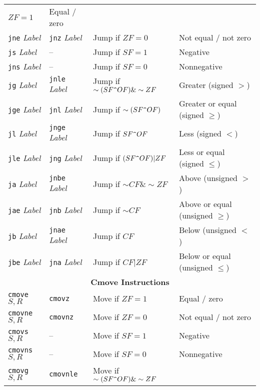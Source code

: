 \begin{table}[h]
\begin{tabular}{l l l l}
        $ZF = 1$ & Equal / zero \\
        \texttt{jne} \textit{Label}  & \texttt{jnz} \textit{Label} & Jump if 
        $ZF = 0$ & Not equal / not zero \\
        \texttt{js} \textit{Label}  & – & Jump if 
        $SF = 1$ & Negative \\
        \texttt{jns} \textit{Label}  & – & Jump if 
        $SF = 0$ & Nonnegative \\
        \texttt{jg} \textit{Label}  & \texttt{jnle} \textit{Label} & Jump if 
        $\sim (SF \texttt{\string^} OF) \& \sim ZF$ & Greater (signed $>$) \\
        \texttt{jge} \textit{Label}  & \texttt{jnl} \textit{Label} & Jump if 
        $\sim (SF \texttt{\string^} OF)$ & Greater or equal (signed $\geq$) \\
        \texttt{jl} \textit{Label}  & \texttt{jnge} \textit{Label} & Jump if 
        $SF \texttt{\string^} OF$ & Less (signed $<$) \\
        \texttt{jle} \textit{Label}  & \texttt{jng} \textit{Label} & Jump if 
        $(SF \texttt{\string^} OF) | ZF$ & Less or equal (signed $\leq$) \\
        \texttt{ja} \textit{Label}  & \texttt{jnbe} \textit{Label} & Jump if 
        $\sim CF \& \sim ZF$ & Above (unsigned $>$) \\
        \texttt{jae} \textit{Label}  & \texttt{jnb} \textit{Label} & Jump if 
        $\sim CF$ & Above or equal (unsigned $\geq$) \\
        \texttt{jb} \textit{Label}  & \texttt{jnae} \textit{Label} & Jump if 
        $CF$ & Below (unsigned $<$) \\
        \texttt{jbe} \textit{Label}  & \texttt{jna} \textit{Label} & Jump if 
        $CF | ZF$ & Below or equal (unsigned $\leq$) \\
        \midrule
        \multicolumn{4}{c}{\textbf{Cmove Instructions}} \\
        \midrule
        \texttt{cmove} $S, R$  & \texttt{cmovz} & Move if $ZF = 1$ 
        & Equal / zero \\
        \texttt{cmovne} $S, R$  & \texttt{cmovnz} & Move if $ZF = 0$ 
        & Not equal / not zero \\
        \texttt{cmovs} $S, R$  & – & Move if $SF = 1$ 
        & Negative \\
        \texttt{cmovns} $S, R$  & – & Move if $SF = 0$ 
        & Nonnegative \\
        \texttt{cmovg} $S, R$  & \texttt{cmovnle} & Move if $\sim (SF \texttt{\string^} OF) \& \sim ZF$ 

\end{tabular}
\end{table}
